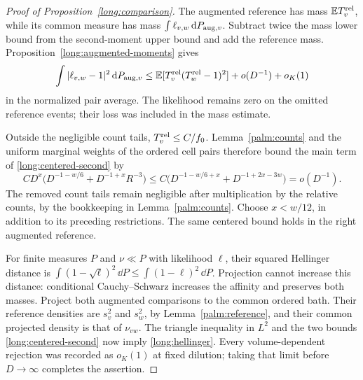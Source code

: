 \begin{proof}[Proof of Proposition~\ref{long:comparison}]
The augmented reference has mass $\mathbb E T_v^{\rm rel}$, while its common
measure has mass $\int\ell_{v,w}\,\mathrm d P_{{\rm aug},v}$.  Subtract twice
the mass lower bound from the second-moment upper bound and add the
reference mass.  Proposition~\ref{long:augmented-moments} gives
\begin{equation}\label{long:centered-second}
 \int|\ell_{v,w}-1|^2\,\mathrm d P_{{\rm aug},v}
 \le \mathbb E[T_v^{\rm rel}(T_w^{\rm rel}-1)^2]
                                      +o(D^{-1})+o_K(1)
\end{equation}
in the normalized pair average.  The likelihood remains zero on the
omitted reference events; their loss was included in the mass estimate.

Outside the negligible count tails, $T_v^{\rm rel}\le C/f_0$.
Lemma~\ref{palm:counts} and the uniform marginal weights of the ordered
cell pairs therefore bound the main term of
\eqref{long:centered-second} by
\[
 C D^x\bigl(D^{-1-w/6}+D^{-1+x}R^{-3}\bigr)
     \le C\bigl(D^{-1-w/6+x}+D^{-1+2x-3w}\bigr)
                                      =o(D^{-1}).
\]
The removed count tails remain negligible after multiplication by the
relative counts, by the bookkeeping in Lemma~\ref{palm:counts}.  Choose
$x<w/12$, in addition to its preceding restrictions.  The same centered
bound holds in the right augmented reference.

For finite measures $P$ and $\nu\ll P$ with likelihood $\ell$, their
squared Hellinger distance is
$\int(1-\sqrt\ell)^2\,\dd P\le\int(1-\ell)^2\,\dd P$.
Projection cannot increase this distance: conditional Cauchy--Schwarz
increases the affinity and preserves both masses.  Project both augmented
comparisons to the common ordered bath.  Their reference densities are
$s_v^2$ and $s_w^2$, by Lemma~\ref{palm:reference}, and their
common projected density is that of $\nu_{vw}$.  The triangle inequality
in $L^2$ and the two bounds \eqref{long:centered-second} now imply
\eqref{long:hellinger}.  Every volume-dependent rejection was recorded
as $o_K(1)$ at fixed dilution; taking that limit before $D\to\infty$
completes the assertion.
\end{proof}
